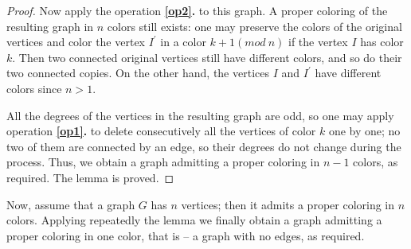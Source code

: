 \begin{problem}
\begin{proof}
Now apply the operation \textbf{\ref{op2}.} to this graph. A proper coloring of the resulting graph in $n$ colors still exists: one may preserve the colors of the original vertices and color the vertex $I^\prime$ in a color $k+1 (mod \  n)$ if the vertex $I$ has color $k$. Then two connected original vertices still have different colors, and so do their two connected copies. On the other hand, the vertices $I$ and $I^\prime$ have different colors since $n > 1$.

All the degrees of the vertices in the resulting graph are odd, so one may apply operation \textbf{\ref{op1}.} to delete consecutively all the vertices of color $k$ one by one; no two of them are connected by an edge, so their degrees do not change during the process. Thus, we obtain a graph admitting a proper coloring in $n - 1$ colors, as required. The lemma is proved. 
\end{proof}

Now, assume that a graph $G$ has $n$ vertices; then it admits a proper coloring in $n$ colors. Applying repeatedly the lemma we finally obtain a graph admitting a proper coloring in one color, that is -- a graph with no edges, as required.
\end{problem}
%
\filbreak
